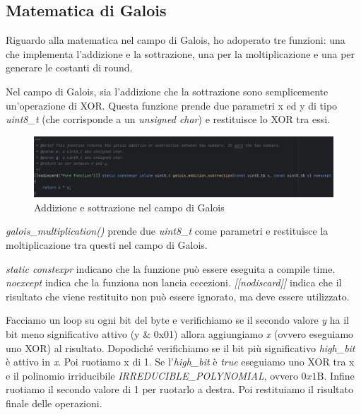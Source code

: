 
\subsection{Matematica di Galois}


\textsf{\small Riguardo alla matematica nel campo di Galois, ho adoperato tre funzioni: una che implementa l'addizione e la sottrazione, una per la moltiplicazione e una per generare le costanti di round.} %

\textsf{\small Nel campo di Galois, sia l'addizione che la sottrazione sono semplicemente un'operazione di XOR. Questa funzione prende due parametri x ed y di tipo \emph{uint8\_t} (che corrisponde a un \emph{unsigned char}) e restituisce lo XOR tra essi.}

\begin{figure}[H]
	\centering
	\includegraphics[width=1\textwidth, height=1\textheight, keepaspectratio]{./images/code/cpp/galois_math/galois_addition_subtraction.PNG}
	\caption{Addizione e sottrazione nel campo di Galois}
	\label{fig:galois_addition_subtraction}
\end{figure}

\textsf{\small \emph{galois\_multiplication()} prende due \emph{uint8\_t} come parametri e restituisce la moltiplicazione tra questi nel campo di Galois.}

\textsf{\emph{static constexpr} indicano che la funzione può essere eseguita a compile time. \emph{noexcept} indica che la funziona non lancia eccezioni. \emph{[[nodiscard]]} indica che il risultato che viene restituito non può essere ignorato, ma deve essere utilizzato.}


\textsf{\small Facciamo un loop su ogni bit del byte e verifichiamo se il secondo valore \emph{y} ha il bit meno significativo attivo (y \& 0x01) allora aggiungiamo \emph{x} (ovvero eseguiamo uno XOR) al risultato. Dopodiché verifichiamo se il bit più significativo \emph{high\_bit} è attivo in \emph{x}. Poi ruotiamo x di 1. Se l'\emph{high\_bit} è \emph{true} eseguiamo uno XOR tra x e il polinomio irriducibile \emph{IRREDUCIBLE\_POLYNOMIAL}, ovvero $0x1\text{B}$. Infine ruotiamo il secondo valore di 1 per ruotarlo a destra. Poi restituiamo il risultato finale delle operazioni.}

